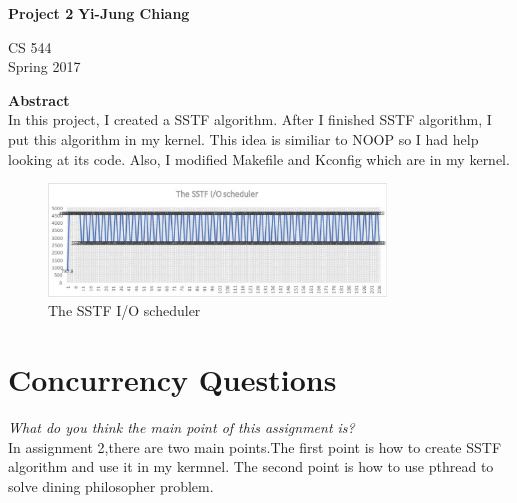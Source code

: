 \documentclass[10pt,conference,draftclsnofoot,onecolumn]{IEEEtran}
\begin{document}
\begin{titlepage}
    \begin{center}
        \vspace*{3.5cm}
        \Large
        \textbf{Project 2}
        \vspace{0.5cm}
        \textbf{Yi-Jung Chiang}
        \vspace{0.8cm}

        CS 544\\
        Spring 2017\\

        \vspace{1cm}

        \textbf{Abstract}\\

        \vspace{0.5cm}
        In this project, I created a SSTF algorithm. After I finished SSTF algorithm, I put this algorithm in my kernel. This idea is similiar to NOOP so I had help looking at its code.  Also, I modified Makefile and Kconfig which are in my kernel.
        \vfill
    \end{center}
\end{titlepage}

\newpage

\begin{figure}
    \includegraphics[width=0.8\textwidth]{Picture1.eps}
  \caption{The SSTF I/O scheduler}
  \label{fig:SSTF}
\end{figure}


\section{Concurrency Questions}

\textit{What do you think the main point of this assignment is?}\\

In assignment 2,there are two main points.The first point is how to create SSTF algorithm and use it in my kermnel. The second point is how to use pthread to solve dining philosopher problem. \\
\end{document}
